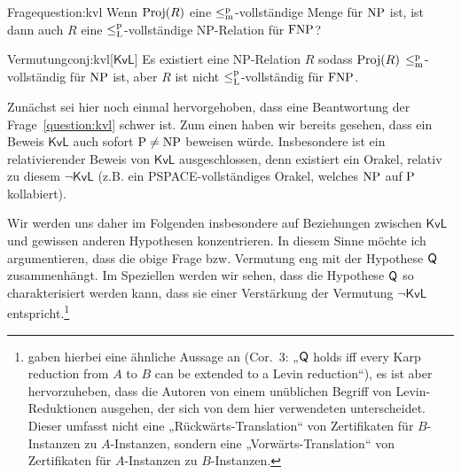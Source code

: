 \begin{reptheorem}{Frage}{question:kvl}
Wenn $\Proj(R)$ eine $\leqmp$-vollständige Menge für $\NP$ ist, ist dann auch $R$ eine $\leqlp$-vollständige NP-Relation für $\FNP$?
\end{reptheorem}

\begin{reptheorem}{Vermutung}{conj:kvl}[$\mathsf{KvL}$]
    Es existiert eine NP-Relation $R$ sodass $\Proj(R)$ $\leqmp$-vollständig für $\NP$ ist, aber $R$ ist nicht $\leqlp$-vollständig für $\FNP$.
\end{reptheorem}

Zunächst sei hier noch einmal hervorgehoben, dass eine Beantwortung der Frage~\ref{question:kvl} schwer ist. Zum einen haben wir bereits gesehen, dass ein Beweis $\mathsf{KvL}$ auch sofort $\P\neq\NP$ beweisen würde. Insbesondere ist ein relativierender Beweis von $\mathsf{KvL}$ ausgeschlossen, denn existiert ein Orakel, relativ zu diesem $\neg\mathsf{KvL}$ (z.B. ein PSPACE-vollständiges Orakel, welches $\NP$ auf $\P$ kollabiert).

Wir werden uns daher im Folgenden insbesondere auf Beziehungen zwischen $\mathsf{KvL}$ und gewissen anderen Hypothesen konzentrieren.
In diesem Sinne möchte ich argumentieren, dass die obige Frage bzw. Vermutung eng mit der Hypothese $\hQ$ zusammenhängt.
Im Speziellen werden wir sehen, dass die Hypothese $\hQ$ so charakterisiert werden kann, dass sie einer Verstärkung der Vermutung $\neg\mathsf{KvL}$ entspricht.\footnote{\textcite{fenner_inverting_2003} gaben hierbei eine ähnliche Aussage an (Cor.~3: „$\hQ$ holds iff every Karp reduction from $A$ to $B$ can be extended to a Levin reduction“), es ist aber hervorzuheben, dass die Autoren von einem unüblichen Begriff von Levin-Reduktionen ausgehen, der sich von dem hier verwendeten unterscheidet. Dieser umfasst nicht eine „Rückwärts-Translation“ von Zertifikaten für $B$-Instanzen zu $A$-Instanzen, sondern eine „Vorwärts-Translation“ von Zertifikaten für $A$-Instanzen zu $B$-Instanzen.}


